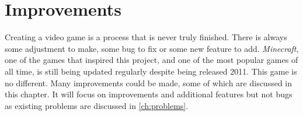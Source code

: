 \chapter{Improvements} \label{ch:improvements}
Creating a video game is a process that is never truly finished.
There is always some adjustment to make, some bug to fix or some new feature to add.
\textit{Minecraft}, one of the games that inspired this project, and one of the most popular games of all time, is still being updated regularly despite being released 2011.
This game is no different.
Many improvements could be made, some of which are discussed in this chapter.
It will focus on improvements and additional features but not bugs as existing problems are discussed in \autoref{ch:problems}.




